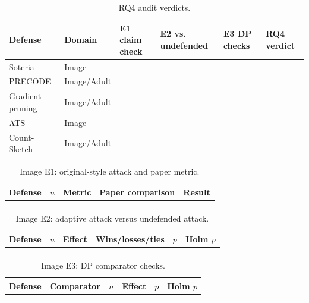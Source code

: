
\begin{table}[t]
\caption{RQ4 audit verdicts.}
\label{tab:rq4-verdicts}
\centering
\begin{tabular}{llllll}
\hline
Defense & Domain & E1 claim check & E2 vs. undefended & E3 DP checks & RQ4 verdict \\
\hline
Soteria & Image & \todo{...} & \todo{...} & \todo{...} & \todo{...} \\
PRECODE & Image/Adult & \todo{...} & \todo{...} & \todo{...} & \todo{...} \\
Gradient pruning & Image/Adult & \todo{...} & \todo{...} & \todo{...} & \todo{...} \\
ATS & Image & \todo{...} & \todo{...} & \todo{...} & \todo{...} \\
Count-Sketch & Image/Adult & \todo{...} & \todo{...} & \todo{...} & \todo{...} \\
\hline
\end{tabular}
\end{table}

\begin{table}[t]
\caption{Image E1: original-style attack and paper metric.}
\label{tab:image-e1}
\centering
\begin{tabular}{lllll}
\hline
Defense & $n$ & Metric & Paper comparison & Result \\
\hline
\todo{...} & \todo{...} & \todo{...} & \todo{...} & \todo{...} \\
\hline
\end{tabular}
\end{table}

\begin{table}[t]
\caption{Image E2: adaptive attack versus undefended attack.}
\label{tab:image-e2}
\centering
\begin{tabular}{llllll}
\hline
Defense & $n$ & Effect & Wins/losses/ties & $p$ & Holm $p$ \\
\hline
\todo{...} & \todo{...} & \todo{...} & \todo{...} & \todo{...} & \todo{...} \\
\hline
\end{tabular}
\end{table}

\begin{table}[t]
\caption{Image E3: DP comparator checks.}
\label{tab:image-e3}
\centering
\begin{tabular}{llllll}
\hline
Defense & Comparator & $n$ & Effect & $p$ & Holm $p$ \\
\hline
\todo{...} & \todo{...} & \todo{...} & \todo{...} & \todo{...} & \todo{...} \\
\hline
\end{tabular}
\end{table}

